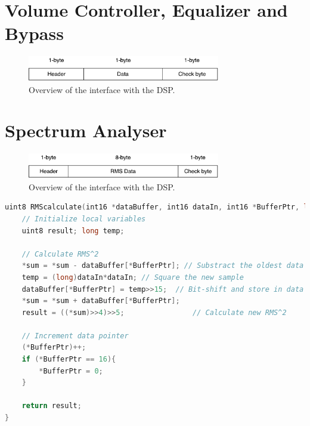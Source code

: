 \section{Volume Controller, Equalizer and Bypass}

\begin{figure}[H]
\centering
\includegraphics[width=0.75\textwidth]{figures/communicationProtocolUART.pdf}
\caption{Overview of the interface with the DSP.}
\label{fig:communicationProtocolUART}
\end{figure}

\section{Spectrum Analyser}

\begin{figure}[H]
\centering
\includegraphics[width=0.75\textwidth]{figures/communicationProtocolUARTTransmit.pdf}
\caption{Overview of the interface with the DSP.}
\label{fig:communicationProtocolUARTTransmit}
\end{figure}


\begin{lstlisting}[language=C, caption = {Calculate RMS value},label={listingSample}]
uint8 RMScalculate(int16 *dataBuffer, int16 dataIn, int16 *BufferPtr, long *sum){
	// Initialize local variables
	uint8 result; long temp;
	
	// Calculate RMS^2
	*sum = *sum - dataBuffer[*BufferPtr]; // Substract the oldest data from sum
	temp = (long)dataIn*dataIn;	// Square the new sample
	dataBuffer[*BufferPtr] = temp>>15;	// Bit-shift and store in data buffer
	*sum = *sum + dataBuffer[*BufferPtr];
	result = ((*sum)>>4)>>5;				// Calculate new RMS^2
	
	// Increment data pointer
	(*BufferPtr)++;
	if (*BufferPtr == 16){ 
		*BufferPtr = 0;
	}
	
	return result;
}
\end{lstlisting}




